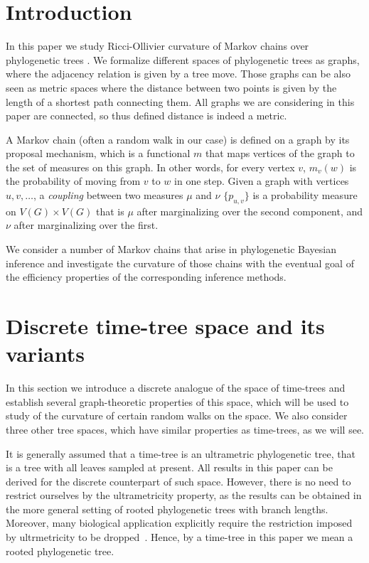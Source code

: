 \documentclass{amsart}
\begin{document}
\section{Introduction}

In this paper we study Ricci-Ollivier curvature of Markov chains over phylogenetic trees \cite{Ollivier2009-cj}.
We formalize different spaces of phylogenetic trees as graphs, where the adjacency
relation is given by a tree move. Those graphs can be also seen as metric
spaces where the distance between two points is given by the length of a
shortest path connecting them. All graphs we are considering in this paper are
connected, so thus defined distance is indeed a metric.

A Markov chain (often a random walk in our case) is defined on a graph by its
proposal mechanism, which is a functional $m$ that maps vertices of the graph to
the set of measures on this graph. In other words, for every vertex $v$,
$m_v(w)$ is the probability of moving from $v$ to $w$ in one step.
Given a graph with vertices ${u, v, \ldots}$, a \emph{coupling} between two measures $\mu$ and $\nu$ $\{p_{u,v}\}$ is a probability measure on $V(G) \times V(G)$ that is $\mu$ after marginalizing over the second component, and $\nu$ after marginalizing over the first.

We consider a number of Markov chains that arise
in phylogenetic Bayesian
inference and investigate the curvature of those chains with the eventual goal of
the efficiency properties of the corresponding inference methods.

\section{Discrete time-tree space and its variants}

In this section we introduce a discrete analogue of the space of time-trees and establish several graph-theoretic properties of this space, which will be used to study of the curvature of certain random walks on the space.
We also consider three other tree spaces, which have similar properties as time-trees, as we will see.

It is generally assumed that a time-tree is an ultrametric phylogenetic tree, that is a tree with all leaves sampled at present.
All results in this paper can be derived for the discrete counterpart of such space.
However, there is no need to restrict ourselves by the ultrametricity property, as the results can be obtained in the more general setting of rooted phylogenetic trees with branch lengths.
Moreover, many biological application explicitly require the restriction imposed by ultrmetricity to be dropped~\cite{}.
Hence, by a time-tree in this paper we mean a rooted phylogenetic tree.
\end{document}
